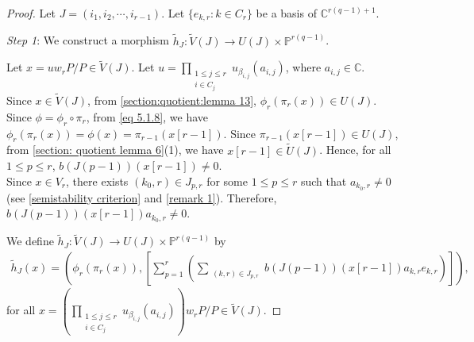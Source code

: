 \documentclass[12pt,reqno]{amsart}
\numberwithin{equation}{section}
\theoremstyle{definition}
\begin{document}
	\begin{proof} Let $J=(i_{1},i_{2},\cdots,i_{r-1})$. 
		Let $\{e_{k,r}: k\in C_{r}\}$ be a basis of $\mathbb{C}^{r(q-1)+1}$.		
		
		{\it Step 1}: We construct a morphism $\tilde{h}_{J}:\tilde{V}(J)\longrightarrow U(J)\times\mathbb{P}^{r(q-1)}$.
		
		Let $x=uw_{r}P/P\in \tilde{V}(J)$. Let $u=\prod_{\substack{1\leq j\leq r\\i\in C_{j}}}u_{\beta_{i,j}}(a_{i,j})$, where $a_{i,j}\in\mathbb{C}$.\\
		Since $x\in\tilde{V}(J)$, from \cref{section:quotient:lemma 13}, $\phi_{r}(\pi_{r}(x))\in U(J)$.\\
		Since $\phi=\phi_{r}\circ\pi_{r}$, from \cref{eq 5.1.8}, we have $\phi_{r}(\pi_{r}(x))=\phi(x)=\pi_{r-1}(x[r-1])$. Since $\pi_{r-1}(x[r-1])\in U(J)$, from \cref{section: quotient lemma 6}(1), we have $x[r-1]\in \tilde{U}(J)$. Hence, for all $1\leq p\leq r$, $b(J(p-1))(x[r-1])\neq 0$.\\
		Since $x\in V_{r}$, there exists $(k_{0},r)\in J_{p,r}$ for some $1\leq p\leq r$ such that $a_{k_{0},r}\neq 0$(see \cref{semistability criterion} and \cref{remark 1}). Therefore, $b(J(p-1))(x[r-1])a_{k_{0},r}\neq 0$.
		
		We define $\tilde{h}_{J}:\tilde{V}(J)\longrightarrow U(J)\times\mathbb{P}^{r(q-1)}$ by 
		\begin{align}\label{eq 5.1.26}
			\tilde{h}_{J}(x)=(\phi_{r}(\pi_{r}(x)),[\sum_{p=1}^{r}(\sum_{\substack{(k,r)\in J_{p,r}}}b(J(p-1))(x[r-1])a_{k,r}e_{k,r})]),
		\end{align}
		for all $x=(\prod_{\substack{1\leq j\leq r\\i\in C_{j}}}u_{\beta_{i,j}}(a_{i,j}))w_{r}P/P\in\tilde{V}(J)$.
		

\end{proof}
\end{document}
